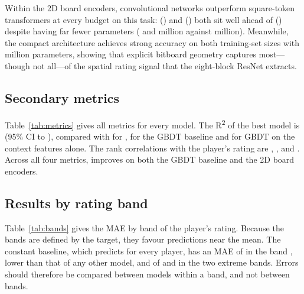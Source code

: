 \documentclass[11pt]{article}
\begin{document}
Within the 2D board encoders, convolutional networks outperform square-token
transformers at every budget on this task: 
() and 
() both sit well ahead of
 () despite
having far fewer parameters ( and
 million against
 million). Meanwhile, the
compact  architecture achieves strong accuracy on both
training-set sizes with  million
parameters, showing that explicit bitboard geometry captures most---though not
all---of the spatial rating signal that the eight-block ResNet extracts.

\subsection{Secondary metrics}

Table~\ref{tab:metrics} gives all metrics for every model. The
R\textsuperscript{2} of the best model is  (95\% CI
 to ), compared with  for
,  for the GBDT baseline and
 for GBDT on the context features alone. The rank
correlations with the player's rating are ,
,  and
. Across all four metrics,  improves
on both the GBDT baseline and the 2D board encoders.

\begin{table}[htbp]\centering\small
{}
\caption{All metrics for every model on the test set. MAE and RMSE are in
rating points (lower is better); for R\textsuperscript{2} and Spearman's rank
correlation higher is better. The constant baseline has no rank
correlation.}
\label{tab:metrics}
\end{table}

\subsection{Results by rating band}
\label{sec:bands}

Table~\ref{tab:bands} gives the MAE by band of the player's rating. Because
the bands are defined by the target, they favour predictions near the mean.
The constant baseline, which predicts  for every player,
has an MAE of  in the band , lower than that
of any other model, and of  and  in the two
extreme bands. Errors should therefore be compared between models within a
band, and not between bands.
\end{document}
